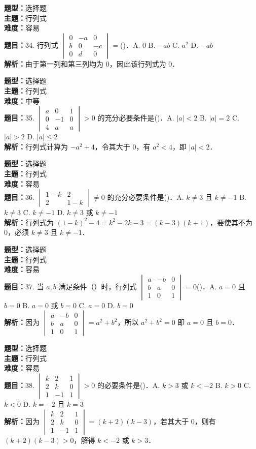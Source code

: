 \documentclass{ctexart}
\newenvironment{question}[5]{%
	\noindent\textbf{题型：}#1\\
	\textbf{主题：}#2\\
	\textbf{难度：}#3\\
	\textbf{题目：}#4\\
	\textbf{解析：}#5\\
	\vspace{1em}
}{}
\begin{document}
	\begin{question}
		{选择题}
		{行列式}
		{容易}
		{34. 行列式 \(\begin{vmatrix} 0 & -a & 0 \\ b & 0 & -c \\ 0 & d & 0\end{vmatrix}=\)(\qquad)．A. 0 B. \(-ab\) C. \(a^2\) D. \(-ab\)}
		{由于第一列和第三列均为 0，因此该行列式为 0．}
	\end{question}
	
	\begin{question}
		{选择题}
		{行列式}
		{中等}
		{35. \(\begin{vmatrix} a & 0 & 1 \\ 0 & -1 & 0 \\ 4 & a & a\end{vmatrix} > 0\) 的充分必要条件是(\qquad)．A. \(|a| < 2\) B. \(|a| = 2\) C. \(|a| > 2\) D. \(|a| \leq 2\)}
		{行列式计算为 \(-a^2 + 4\)，令其大于 0，有 \(a^2 < 4\)，即 \(|a| < 2\)．}
	\end{question}
	
	\begin{question}
		{选择题}
		{行列式}
		{容易}
		{36. \(\begin{vmatrix} 1 - k & 2 \\ 2 & 1 - k\end{vmatrix} \neq 0\) 的充分必要条件是(\qquad)．A. \(k \neq 3\) 且 \(k \neq -1\) B. \(k \neq 3\) C. \(k \neq -1\) D. \(k \neq 3\) 或 \(k \neq -1\)}
		{行列式为 \((1 - k)^2 - 4 = k^2 - 2k - 3 = (k - 3)(k + 1)\)，要使其不为 0，必须 \(k \neq 3\) 且 \(k \neq -1\)．}
	\end{question}
	
	\begin{question}
		{选择题}
		{行列式}
		{容易}
		{37. 当 \(a, b\) 满足条件（）时，行列式 \(\begin{vmatrix} a & -b & 0 \\ b & a & 0 \\ 1 & 0 & 1\end{vmatrix}=0\)(\qquad)．A. \(a=0\) 且 \(b=0\) B. \(a=0\) 或 \(b=0\) C. \(a=0\) D. \(b=0\)}
		{因为 \(\begin{vmatrix} a & -b & 0 \\ b & a & 0 \\ 1 & 0 & 1\end{vmatrix}=a^2+b^2\)，所以 \(a^2+b^2=0\) 即 \(a=0\) 且 \(b=0\)．}
	\end{question}
	
	\begin{question}
		{选择题}
		{行列式}
		{容易}
		{38. \(\begin{vmatrix} k & 2 & 1 \\ 2 & k & 0 \\ 1 & -1 & 1\end{vmatrix}>0\) 的必要条件是(\qquad)．A. \(k>3\) 或 \(k<-2\) B. \(k>0\) C. \(k<0\) D. \(k=-2\) 且 \(k=3\)}
		{因为 \(\begin{vmatrix} k & 2 & 1 \\ 2 & k & 0 \\ 1 & -1 & 1\end{vmatrix}=(k+2)(k-3)\)，若其大于 0，则有 \((k+2)(k-3)>0\)，解得 \(k<-2\) 或 \(k>3\)．}
	\end{question}
	
\end{document}
